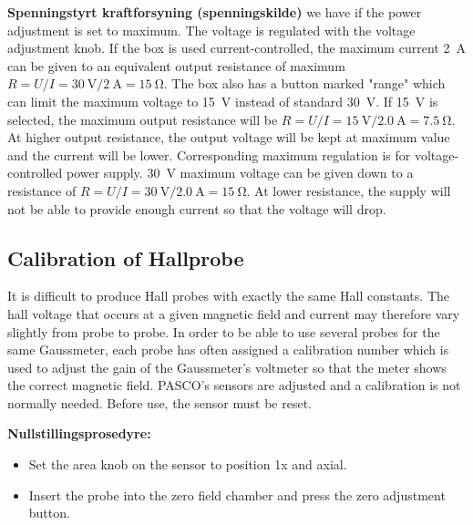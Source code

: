 \documentclass[../Elmag-labhefte-2020.tex]{subfiles}
\begin{document}
\begin{itemize}
    \textbf{Spenningstyrt kraftforsyning (spenningskilde)} we have if the power adjustment is set to maximum. The voltage is regulated with the voltage adjustment knob.
    If the box is used current-controlled, the maximum current \SI{2}{\ampere} can be given to an equivalent output resistance of maximum $R = U/I = \SI{30}{\volt} / \SI{2}{\ampere} = \SI{15}{\ohm}$. The box also has a button marked "range" which can limit the maximum voltage to \SI{15}{\volt} instead of standard \SI{30}{\volt}. If \SI{15}{\volt} is selected, the maximum output resistance will be $R = U/I = \SI{15}{\volt} / \SI{2,0}{\ampere} = \SI{7,5}{\ohm}$. At higher output resistance, the output voltage will be kept at maximum value and the current will be lower.
    Corresponding maximum regulation is for voltage-controlled power supply. \SI{30}{\volt} maximum voltage can be given down to a resistance of $R = U/I = \SI{30}{\volt} / \SI{2,0}{\ampere} = \SI{15}{\ohm}$. At lower resistance, the supply will not be able to provide enough current so that the voltage will drop.
\end{itemize}

\subsection{Calibration of Hallprobe}

It is difficult to produce Hall probes with exactly the same Hall constants. The hall voltage that occurs at a given magnetic field and current may therefore vary slightly from probe to probe. In order to be able to use several probes for the same Gaussmeter, each probe has often assigned a calibration number which is used to adjust the gain of the Gaussmeter's voltmeter so that the meter shows the correct magnetic field. PASCO's sensors are adjusted and a calibration is not normally needed. Before use, the sensor must be reset.

\textbf{Nullstillingsprosedyre:}
\vspace{-5mm}
\begin{itemize}
    \item Set the area knob on the sensor to position 1x and axial.
    \item Insert the probe into the zero field chamber and press the zero adjustment button.
\end{itemize}
\end{document}
